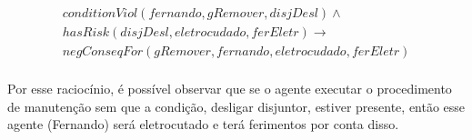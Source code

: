 \begin{eqnarray}\label{applicationCodViolIntrodCase}\nonumber
	conditionViol(fernando,gRemover,disjDesl)  \wedge \\
	hasRisk(disjDesl, eletrocudado, ferEletr) \to \nonumber \\ 
	negConseqFor(gRemover,fernando,eletrocudado,ferEletr) \nonumber \\ 
\end{eqnarray}	

Por esse raciocínio, é possível observar que se o agente executar o procedimento de manutenção sem que a condição, desligar disjuntor, estiver presente, então esse agente (Fernando) será eletrocutado e terá ferimentos por conta disso. 